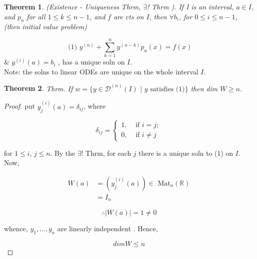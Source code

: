 \documentclass{article}
\newtheorem*{theorem}{Theorem}
\theoremstyle{definition}
\begin{document}




\hrulefill
\begin{theorem}
  (Existence - Uniqueness Thrm, \( \exists \)! Thrm ). If I is an
  interval, \( a \in I \), and \( p_u \) for all \( 1 \leq k \leq n-1 \),
  and \( f \) are cts on \( I \), then 
  \( \forall b_i \), for \( 0 \leq i \leq n-1 \), (then initial value problem)  
\end{theorem}

\[ \text{ (1) } y^{(n)} + \sum_{k=1}^n y^{(n-k)} p_u(x) = f(x) \]
\& \( y^{(i)} (a) = b_i  \) , has a unique soln on \( I \). \\
Note: the solns to linear ODEs are unique on the whole interval \( I
\).\\[5mm]

\begin{theorem}
  Thrm. If \( w = \{ y \in \mathscr{D}^{(n)} (I) \text{ | } y \text{ satisfies (1)}
  \} \) then
  dim \( W \geq n \). \\[5mm]
\end{theorem}

\begin{proof}
  put \( y^{(i)}_j (a) = \delta_{ij} \),  where

  \[ 
  \delta_{ij} =
  \begin{cases}
    1, & \text{ if } i = j; \\
    0, & \text{ if } i \neq j
  \end{cases}
  \]

  for \( 1 \leq i \), \( j \leq n \). By the \( \exists \)! Thrm, for each
  \( j \) there is a unique soln to (1) on \( I \). Now, 

  \begin{align*}
    W(a) &= (y_j^{(i)}(a) ) \in \text{ Mat}_n( \mathbb{R}) \\
    &= I_n
  \end{align*}

  \[ \therefore |W(a)|=1 \neq 0 \]

  whence, \( y_1, \dots , y_n \) are linearly independent . Hence,

  \[ dim W \leq n  \]
\end{proof}
\end{document}

